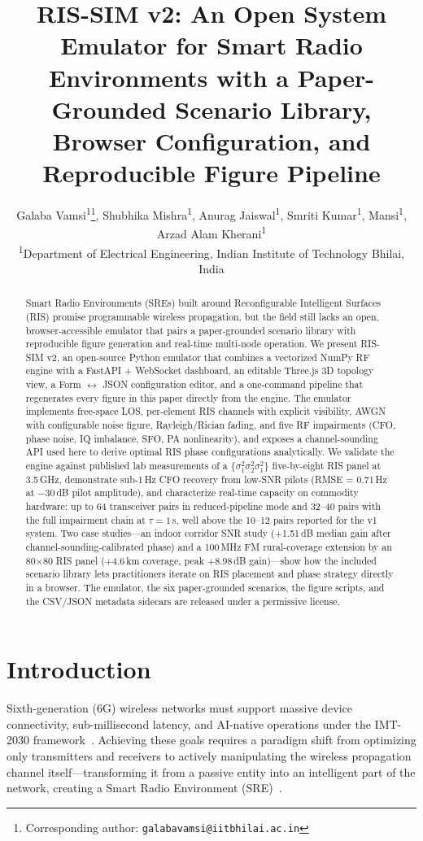 \documentclass{article}
\title{RIS-SIM v2: An Open System Emulator for Smart Radio Environments with a Paper-Grounded Scenario Library, Browser Configuration, and Reproducible Figure Pipeline}
\author{%
  Galaba Vamsi\textsuperscript{1}\thanks{Corresponding author: \texttt{galabavamsi@iitbhilai.ac.in}},
  Shubhika Mishra\textsuperscript{1},
  Anurag Jaiswal\textsuperscript{1},
  Smriti Kumar\textsuperscript{1},
  Mansi\textsuperscript{1},
  Arzad Alam Kherani\textsuperscript{1} \\
  \textsuperscript{1}Department of Electrical Engineering, Indian Institute of Technology Bhilai, India
}
\begin{document}
\maketitle

\begin{abstract}
Smart Radio Environments (SREs) built around Reconfigurable Intelligent Surfaces (RIS) promise programmable wireless propagation, but the field still lacks an open, browser-accessible emulator that pairs a paper-grounded scenario library with reproducible figure generation and real-time multi-node operation. We present RIS-SIM v2, an open-source Python emulator that combines a vectorized NumPy RF engine with a FastAPI + WebSocket dashboard, an editable Three.js 3D topology view, a Form $\leftrightarrow$ JSON configuration editor, and a one-command pipeline that regenerates every figure in this paper directly from the engine. The emulator implements free-space LOS, per-element RIS channels with explicit visibility, AWGN with configurable noise figure, Rayleigh/Rician fading, and five RF impairments (CFO, phase noise, IQ imbalance, SFO, PA nonlinearity), and exposes a channel-sounding API used here to derive optimal RIS phase configurations analytically. We validate the engine against published lab measurements of a $\{\sigma_1^2\sigma_2^2\sigma_1^2\}$ five-by-eight RIS panel at 3.5\,GHz, demonstrate sub-1\,Hz CFO recovery from low-SNR pilots (RMSE = 0.71\,Hz at $-30$\,dB pilot amplitude), and characterize real-time capacity on commodity hardware: up to 64 transceiver pairs in reduced-pipeline mode and 32--40 pairs with the full impairment chain at $\tau = 1$\,s, well above the 10--12 pairs reported for the v1 system. Two case studies---an indoor corridor SNR study (+1.51\,dB median gain after channel-sounding-calibrated phase) and a 100\,MHz FM rural-coverage extension by an 80$\times$80 RIS panel (+4.6\,km coverage, peak +8.98\,dB gain)---show how the included scenario library lets practitioners iterate on RIS placement and phase strategy directly in a browser. The emulator, the six paper-grounded scenarios, the figure scripts, and the CSV/JSON metadata sidecars are released under a permissive license.
\end{abstract}

\section{Introduction}

Sixth-generation (6G) wireless networks must support massive device connectivity, sub-millisecond latency, and AI-native operations under the IMT-2030 framework~\cite{ITU_IMT2030}. Achieving these goals requires a paradigm shift from optimizing only transmitters and receivers to actively manipulating the wireless propagation channel itself---transforming it from a passive entity into an intelligent part of the network, creating a Smart Radio Environment (SRE)~\cite{Smart_Radio_Environments_Di_Renzo}.
\end{document}
